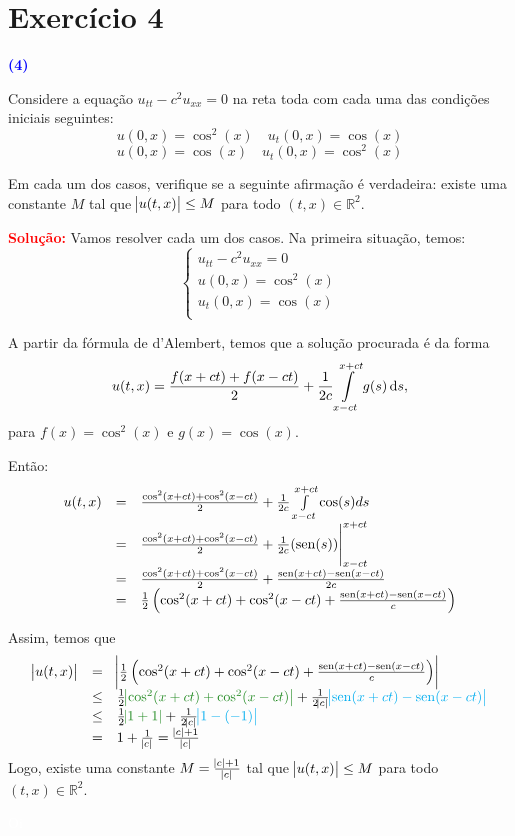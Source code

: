 \documentclass[11pt,a4paper]{article}
\newcommand{\exercicio}[1]{\section*{Exercício #1} \textcolor{blue}{\bf(#1)}}
\newcommand{\solucao}[1]{\begin{mdframed}[style=MyFrame]
\textbf{\textcolor{red}{Solução:}} #1
\end{mdframed}\textcolor{white}{Oi} \newline}
\begin{document}
\exercicio{4}

Considere a equação $u_{tt} - c^2u_{xx} = 0$ na reta toda com cada uma das condições iniciais seguintes:
\[ u(0, x) = \cos^2(x) \quad u_t(0, x) = \cos(x)\]
\[u(0, x) = \cos(x) \quad u_t(0, x) = \cos^2(x) \]

Em cada um dos casos, verifique se a seguinte afirmação é verdadeira:
existe uma constante $M$ tal que $\abs{u(t, x)} \le M$ para todo $(t, x) \in \mathbb{R}^2.$

\solucao{
Vamos resolver cada um dos casos. Na primeira situação, temos:
\[\left\{\begin{array}{c}
     u_{tt} - c^2u_{xx} = 0  \\
     u(0, x) = \cos^2(x) \\
     u_t(0, x) = \cos(x) \\
\end{array}\right.\]

A partir da fórmula de d'Alembert, temos que a solução procurada é da forma
\[
u(t,x) = \frac{f(x + ct) + f(x - ct)}{2} + \frac{1}{2c} \int\limits_{x  -ct}^{x + ct} g(s) \dif s,
\]
para $f(x) = \cos^2(x)$ e $g(x) = \cos(x).$

Então:
\[\begin{array}{lcl}
u(t,x) &=& \frac{\cos^2(x + ct) + \cos^2(x - ct)}{2} + \frac{1}{2c} \int\limits_{x  -ct}^{x + ct} \cos(s) ds  \\
& = & \frac{\cos^2(x + ct) + \cos^2(x - ct)}{2} + \frac{1}{2c} ({\rm sen}(s)) \Biggr|_{x  -ct}^{x + ct} \\
& = &  \frac{\cos^2(x + ct) + \cos^2(x - ct)}{2} + \frac{{\rm sen}(x+ct) - {\rm sen}(x - ct)}{2c} \\
& = &  \frac{1}{2} \left(\cos^2(x + ct) + \cos^2(x - ct) + \frac{{\rm sen}(x+ct) - {\rm sen}(x - ct)}{c}  \right)\\
\end{array}
\]

Assim, temos que
\[
\begin{array}{lcl}
\abs{u(t,x)} &=& \abs{\frac{1}{2} \left(\cos^2(x + ct) + \cos^2(x - ct) + \frac{\sen(x+ct) - \sen(x - ct)}{c}  \right)} \\
& \le & \frac{1}{2} \textcolor{Floresta}{\abs{ \cos^2(x + ct) + \cos^2(x - ct)}} + \frac{1}{2\abs{c} } \textcolor{cyan}{\abs{\sen(x+ct) - \sen(x - ct) }} \\
& \le & \frac{1}{2} \textcolor{Floresta}{\abs{ 1 + 1}} + \frac{1}{2\abs{c} } \textcolor{cyan}{\abs{1 - (-1) }} \\
& = & 1 + \frac{1}{\abs{c}} = \frac{\abs{c} + 1}{\abs{c}}\\
\end{array}
\]
Logo, existe uma constante $M = \frac{\abs{c} + 1}{\abs{c}}$ tal que $\abs{u(t,x)} \le M$ para todo $(t,x) \in \mathbb{R}^2.$

}
\end{document}
